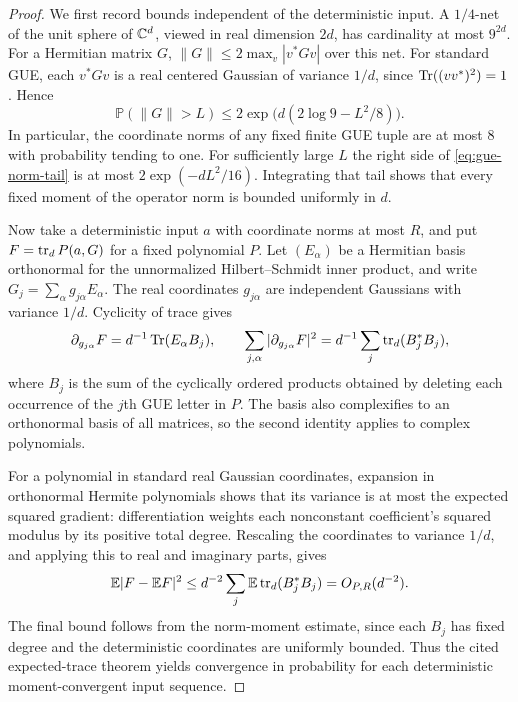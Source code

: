 \begin{proof}
We first record bounds independent of the deterministic input. A
$1/4$-net of the unit sphere of $\mathbb C^d$, viewed in real dimension $2d$,
has cardinality at most $9^{2d}$. For a Hermitian matrix $G$,
$\|G\|\leq2\max_v|v^*Gv|$ over this net. For standard GUE, each
$v^*Gv$ is a real centered Gaussian of variance $1/d$, since
$\operatorname{Tr}((vv^*)^2)=1$. Hence
\begin{equation}\label{eq:gue-norm-tail}
 \mathbb P(\|G\|>L)
 \leq 2\exp\big(d(2\log9-L^2/8)\big).
\end{equation}
In particular, the coordinate norms of any fixed finite GUE tuple are
at most $8$ with probability tending to one. For sufficiently large $L$
the right side of \eqref{eq:gue-norm-tail} is at most
$2\exp(-dL^2/16)$. Integrating that tail shows that every fixed moment
of the operator norm is bounded uniformly in $d$.

Now take a deterministic input $a$ with coordinate norms at most $R$,
and put $F=\operatorname{tr}_d P(a,G)$ for a fixed polynomial $P$. Let $(E_\alpha)$
be a Hermitian basis orthonormal for the unnormalized Hilbert--Schmidt
inner product, and write $G_j=\sum_\alpha g_{j\alpha}E_\alpha$.
The real coordinates $g_{j\alpha}$ are independent Gaussians with
variance $1/d$. Cyclicity of trace gives
\[
 \partial_{g_{j\alpha}}F=d^{-1}\operatorname{Tr}(E_\alpha B_j),\qquad
 \sum_{j,\alpha}|\partial_{g_{j\alpha}}F|^2
 =d^{-1}\sum_j\operatorname{tr}_d(B_j^*B_j),
\]
where $B_j$ is the sum of the cyclically ordered products obtained by
deleting each occurrence of the $j$th GUE letter in $P$. The basis also
complexifies to an orthonormal basis of all matrices, so the second
identity applies to complex polynomials.

For a polynomial in standard real Gaussian coordinates, expansion in
orthonormal Hermite polynomials shows that its variance is at most the
expected squared gradient: differentiation weights each nonconstant
coefficient's squared modulus by its positive total degree. Rescaling
the coordinates to variance $1/d$, and applying this to real and
imaginary parts, gives
\begin{equation}\label{eq:gue-trace-variance}
 \mathbb E|F-\mathbb E F|^2
 \leq d^{-2}\sum_j\mathbb E\operatorname{tr}_d(B_j^*B_j)
 =O_{P,R}(d^{-2}).
\end{equation}
The final bound follows from the norm-moment estimate, since each $B_j$
has fixed degree and the deterministic coordinates are uniformly bounded.
Thus the cited expected-trace theorem yields convergence in probability
for each deterministic moment-convergent input sequence.


\end{proof}

